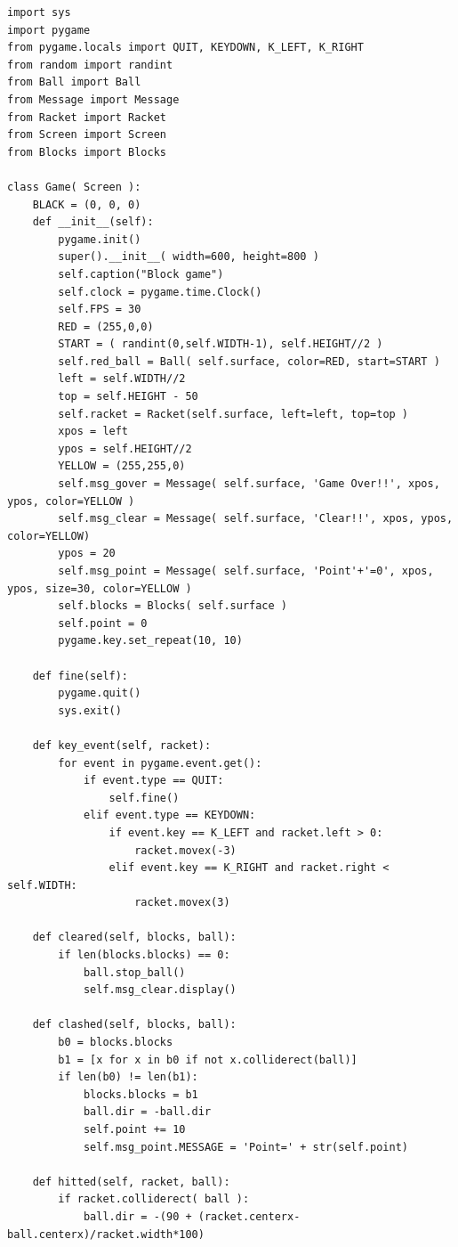 \documentclass[uplatex,a4paper,11pt,oneside,openany]{jsbook}
\begin{document}
\begin{lstlisting}[caption=Gameクラス（Screenクラスを継承）,label=p2]
import sys
import pygame
from pygame.locals import QUIT, KEYDOWN, K_LEFT, K_RIGHT
from random import randint
from Ball import Ball
from Message import Message
from Racket import Racket
from Screen import Screen
from Blocks import Blocks

class Game( Screen ):
    BLACK = (0, 0, 0)
    def __init__(self):
        pygame.init()
        super().__init__( width=600, height=800 )
        self.caption("Block game")
        self.clock = pygame.time.Clock()
        self.FPS = 30
        RED = (255,0,0)
        START = ( randint(0,self.WIDTH-1), self.HEIGHT//2 )
        self.red_ball = Ball( self.surface, color=RED, start=START )
        left = self.WIDTH//2
        top = self.HEIGHT - 50
        self.racket = Racket(self.surface, left=left, top=top )
        xpos = left
        ypos = self.HEIGHT//2
        YELLOW = (255,255,0)
        self.msg_gover = Message( self.surface, 'Game Over!!', xpos, ypos, color=YELLOW )
        self.msg_clear = Message( self.surface, 'Clear!!', xpos, ypos, color=YELLOW)
        ypos = 20
        self.msg_point = Message( self.surface, 'Point'+'=0', xpos, ypos, size=30, color=YELLOW )
        self.blocks = Blocks( self.surface )
        self.point = 0
        pygame.key.set_repeat(10, 10)

    def fine(self):
        pygame.quit()
        sys.exit()

    def key_event(self, racket):
        for event in pygame.event.get():
            if event.type == QUIT:
                self.fine()
            elif event.type == KEYDOWN:
                if event.key == K_LEFT and racket.left > 0:
                    racket.movex(-3)
                elif event.key == K_RIGHT and racket.right < self.WIDTH:
                    racket.movex(3)

    def cleared(self, blocks, ball):
        if len(blocks.blocks) == 0:
            ball.stop_ball()
            self.msg_clear.display()

    def clashed(self, blocks, ball):
        b0 = blocks.blocks
        b1 = [x for x in b0 if not x.colliderect(ball)]
        if len(b0) != len(b1):
            blocks.blocks = b1
            ball.dir = -ball.dir
            self.point += 10
            self.msg_point.MESSAGE = 'Point=' + str(self.point)

    def hitted(self, racket, ball):
        if racket.colliderect( ball ):
            ball.dir = -(90 + (racket.centerx-ball.centerx)/racket.width*100)


\end{lstlisting}
\end{document}
